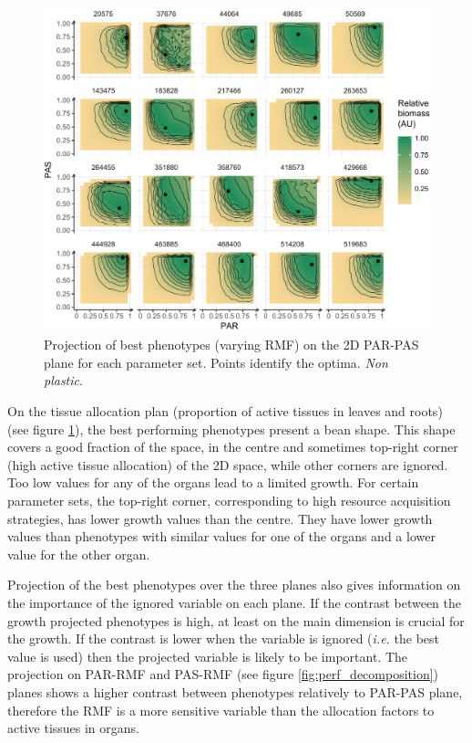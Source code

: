 \begin{figure}\label{fig:best_phenotypes}
\includegraphics[width = \textwidth]{./2_PP/Figures/Landscape/landscape_PAR-PAS.pdf}
\caption{Projection of best phenotypes (varying RMF) on the 2D PAR-PAS plane for each parameter set. Points identify the optima. \textit{Non plastic}.}
\end{figure}

 On the tissue allocation plan (proportion of active tissues in leaves and roots) (see figure \ref{fig:best_phenotypes}), the best performing phenotypes present a bean shape. This shape covers a good fraction of the space, in the centre and sometimes top-right corner (high active tissue allocation) of the 2D space, while other corners are ignored. Too low values for any of the organs lead to a limited growth. For certain parameter sets, the top-right corner, corresponding to high resource acquisition strategies, has lower growth values than the centre. They have lower growth values than phenotypes with similar values for one of the organs and a lower value for the other organ.  %
 

Projection of the best phenotypes over the three planes also gives information on the importance of the ignored variable on each plane. If the contrast between the growth projected phenotypes is high, at least on the main dimension is crucial for the growth. If the contrast is lower when the variable is ignored (\textit{i.e.} the best value is used) then the projected variable is likely to be important. The projection on PAR-RMF and PAS-RMF (see figure \ref{fig:perf_decomposition}) planes shows a higher contrast between phenotypes relatively to PAR-PAS plane, therefore the RMF is a more sensitive variable than the allocation factors to active tissues in organs.


